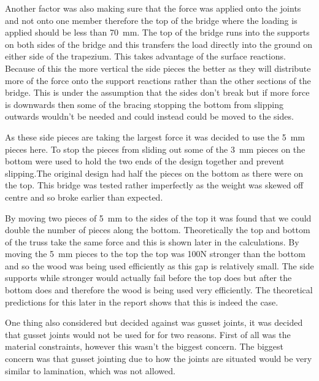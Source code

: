 \documentclass[12pt]{article}
\begin{document}
Another factor was also making sure that the force was applied onto the joints and not onto one member therefore the top of the bridge where the loading is applied should be less than 70~mm. The top of the bridge runs into the supports on both sides of the bridge and this transfers the load directly into the ground on either side of the trapezium. This takes advantage of the surface reactions. Because of this the more vertical the side pieces the better as they will distribute more of the force onto the support reactions rather than the other sections of the bridge. This is under the assumption that the sides don’t break but if more force is downwards then some of the bracing stopping the bottom from slipping outwards wouldn't be needed and could instead could be moved to the sides.  

As these side pieces are taking the largest force it was decided to use the 5~mm pieces here. To stop the pieces from sliding out some of the 3~mm pieces on the bottom were used to hold the two ends of the design together and prevent slipping.The original design had half the pieces on the bottom as there were on the top. This bridge was tested rather imperfectly as the weight was skewed off centre and so broke earlier than expected. 

By moving two pieces of 5~mm to the sides of the top it was found that we could double the number of pieces along the bottom. Theoretically the top and bottom of the truss take the same force and this is shown later in the calculations. By moving the 5~mm pieces to the top the top was 100N stronger than the bottom and so the wood was being used efficiently as this gap is relatively small. The side supports while stronger would actually fail before the top does but after the bottom does and therefore the wood is being used very efficiently. The theoretical predictions for this later in the report shows that this is indeed the case.

One thing also considered but decided against was gusset joints, it was decided that gusset joints would not be used for for two reasons. First of all was the material constraints, however this wasn't the biggest concern. The biggest concern was that gusset jointing due to how the joints are situated would be very similar to lamination, which was not allowed.
\end{document}
